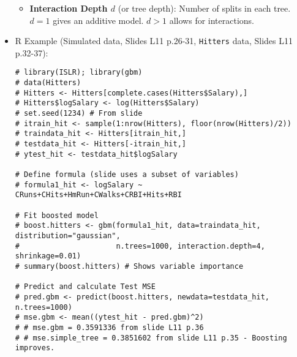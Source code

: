 \documentclass[12pt,a4paper]{article}
\newcommand{\Robject}[1]{\texttt{#1}} %
\begin{document}
\begin{itemize}
\begin{itemize}
                    \item \textbf{Interaction Depth $d$} (or tree depth): Number of splits in each tree. $d=1$ gives an additive model. $d>1$ allows for interactions.
                \end{itemize}
            \item R Example (Simulated data, Slides L11 p.26-31, \Robject{Hitters} data, Slides L11 p.32-37):
\begin{lstlisting}[caption={Boosting with gbm Package (Hitters data, Slides L11 p.36)}]
# library(ISLR); library(gbm)
# data(Hitters)
# Hitters <- Hitters[complete.cases(Hitters$Salary),]
# Hitters$logSalary <- log(Hitters$Salary)
# set.seed(1234) # From slide
# itrain_hit <- sample(1:nrow(Hitters), floor(nrow(Hitters)/2))
# traindata_hit <- Hitters[itrain_hit,]
# testdata_hit <- Hitters[-itrain_hit,]
# ytest_hit <- testdata_hit$logSalary

# Define formula (slide uses a subset of variables)
# formula1_hit <- logSalary ~ CRuns+CHits+HmRun+CWalks+CRBI+Hits+RBI 

# Fit boosted model
# boost.hitters <- gbm(formula1_hit, data=traindata_hit, distribution="gaussian",
#                      n.trees=1000, interaction.depth=4, shrinkage=0.01)
# summary(boost.hitters) # Shows variable importance

# Predict and calculate Test MSE
# pred.gbm <- predict(boost.hitters, newdata=testdata_hit, n.trees=1000)
# mse.gbm <- mean((ytest_hit - pred.gbm)^2) 
# # mse.gbm = 0.3591336 from slide L11 p.36
# # mse.simple_tree = 0.3851602 from slide L11 p.35 - Boosting improves.
\end{lstlisting}
        \end{itemize}
\end{document}
